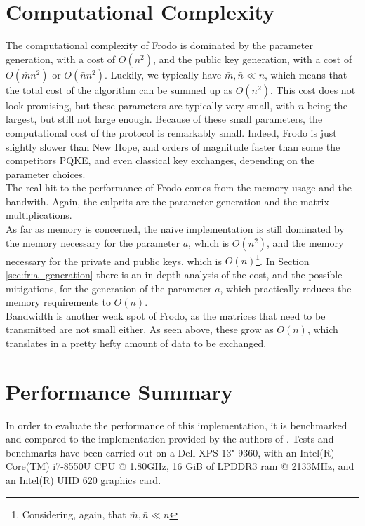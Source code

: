 \section{Computational Complexity}
The computational complexity of Frodo is dominated by the parameter generation, with a cost of $O(n^2)$, and the public key generation, with a cost of $O(\bar{m}n^2)$ or $O(\bar{n}n^2)$. Luckily, we typically have $\bar{m},\bar{n} \ll n$, which means that the total cost of the algorithm can be summed up as $O(n^2)$. This cost does not look promising, but these parameters are typically very small, with $n$ being the largest, but still not large enough. Because of these small parameters, the computational cost of the protocol is remarkably small. Indeed, Frodo is just slightly slower than New Hope, and orders of magnitude faster than some the competitors PQKE, and even classical key exchanges, depending on the parameter choices.\\
The real hit to the performance of Frodo comes from the memory usage and the bandwith. Again, the culprits are the parameter generation and the matrix multiplications.\\
As far as memory is concerned, the naive implementation is still dominated by the memory necessary for the parameter $a$, which is $O(n^2)$, and the memory necessary for the private and public keys, which is $O(n)$\footnote{Considering, again, that $\bar{m},\bar{n} \ll n$}. In Section \ref{sec:fr:a_generation} there is an in-depth analysis of the cost, and the possible mitigations, for the generation of the parameter $a$, which practically reduces the memory requirements to $O(n)$.\\
Bandwidth is another weak spot of Frodo, as the matrices that need to be transmitted are not small either. As seen above, these grow as $O(n)$, which translates in a pretty hefty amount of data to be exchanged.\\

\section{Performance Summary}
In order to evaluate the performance of this implementation, it is benchmarked and compared to the implementation provided by the authors of \cite{frodo}. Tests and benchmarks have been carried out on a Dell XPS 13" 9360, with an Intel(R) Core(TM) i7-8550U CPU @ 1.80GHz, 16 GiB of LPDDR3 ram @ 2133MHz, and an Intel(R) UHD 620 graphics card. 